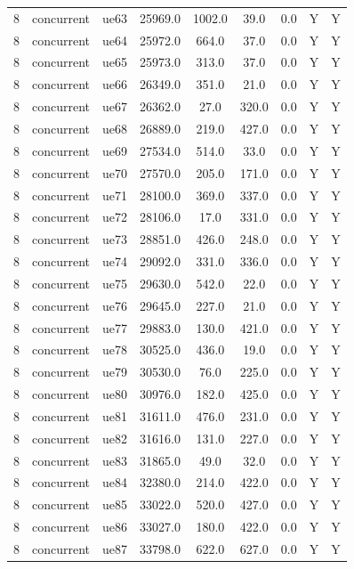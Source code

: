 \begin{table}[ht]
\begin{tabular}{|c|c|c|c|c|c|c|c|c|}
8 & concurrent & ue63 & 25969.0 & 1002.0 & 39.0 & 0.0 & Y & Y \\
8 & concurrent & ue64 & 25972.0 & 664.0 & 37.0 & 0.0 & Y & Y \\
8 & concurrent & ue65 & 25973.0 & 313.0 & 37.0 & 0.0 & Y & Y \\
8 & concurrent & ue66 & 26349.0 & 351.0 & 21.0 & 0.0 & Y & Y \\
8 & concurrent & ue67 & 26362.0 & 27.0 & 320.0 & 0.0 & Y & Y \\
8 & concurrent & ue68 & 26889.0 & 219.0 & 427.0 & 0.0 & Y & Y \\
8 & concurrent & ue69 & 27534.0 & 514.0 & 33.0 & 0.0 & Y & Y \\
8 & concurrent & ue70 & 27570.0 & 205.0 & 171.0 & 0.0 & Y & Y \\
8 & concurrent & ue71 & 28100.0 & 369.0 & 337.0 & 0.0 & Y & Y \\
8 & concurrent & ue72 & 28106.0 & 17.0 & 331.0 & 0.0 & Y & Y \\
8 & concurrent & ue73 & 28851.0 & 426.0 & 248.0 & 0.0 & Y & Y \\
8 & concurrent & ue74 & 29092.0 & 331.0 & 336.0 & 0.0 & Y & Y \\
8 & concurrent & ue75 & 29630.0 & 542.0 & 22.0 & 0.0 & Y & Y \\
8 & concurrent & ue76 & 29645.0 & 227.0 & 21.0 & 0.0 & Y & Y \\
8 & concurrent & ue77 & 29883.0 & 130.0 & 421.0 & 0.0 & Y & Y \\
8 & concurrent & ue78 & 30525.0 & 436.0 & 19.0 & 0.0 & Y & Y \\
8 & concurrent & ue79 & 30530.0 & 76.0 & 225.0 & 0.0 & Y & Y \\
8 & concurrent & ue80 & 30976.0 & 182.0 & 425.0 & 0.0 & Y & Y \\
8 & concurrent & ue81 & 31611.0 & 476.0 & 231.0 & 0.0 & Y & Y \\
8 & concurrent & ue82 & 31616.0 & 131.0 & 227.0 & 0.0 & Y & Y \\
8 & concurrent & ue83 & 31865.0 & 49.0 & 32.0 & 0.0 & Y & Y \\
8 & concurrent & ue84 & 32380.0 & 214.0 & 422.0 & 0.0 & Y & Y \\
8 & concurrent & ue85 & 33022.0 & 520.0 & 427.0 & 0.0 & Y & Y \\
8 & concurrent & ue86 & 33027.0 & 180.0 & 422.0 & 0.0 & Y & Y \\
8 & concurrent & ue87 & 33798.0 & 622.0 & 627.0 & 0.0 & Y & Y \\

\end{tabular}
\end{table}
